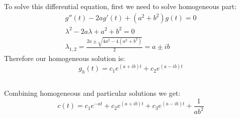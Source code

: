 \documentclass[12pt]{article}
\begin{document}
\subsection{}
To solve this differential equation, first we need to solve homogeneous part:
\begin{equation}
    \begin{gathered}
        g''(t)-2ag'(t) + (a^2+b^2)g(t) = 0\\
        \lambda^2-2a\lambda+a^2+b^2 = 0\\
        \lambda_{1,2} = \frac{2a\pm\sqrt{4a^2-4(a^2+b^2)}}{2} = a\pm ib
    \end{gathered}
\end{equation}
Therefore our homogeneous solution is:
\begin{equation}
    g_h(t) = c_1e^{(a+ib)t}+c_2e^{(a-ib)t}
\end{equation}
\subsection{}
Combining homogeneous and particular solutions we get:
\begin{equation}
    c(t) = c_1e^{-at}+ c_2e^{(a+ib)t}+c_3e^{(a-ib)t}+\frac{1}{ab^2}
\end{equation}
\end{document}
